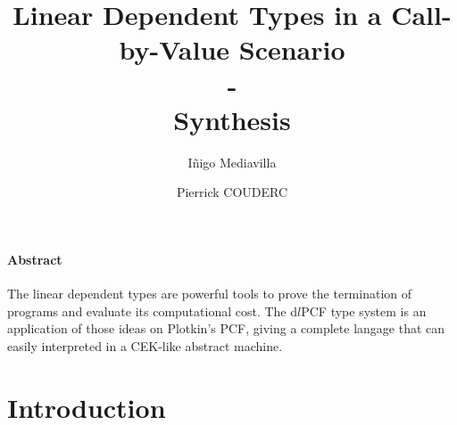 \documentclass[a4paper,12pt]{article}
\title{Linear Dependent Types in a Call-by-Value Scenario \\
- \\
Synthesis}
\author{I\~{n}igo Mediavilla \and Pierrick COUDERC}
\begin{document}
\maketitle









\paragraph{Abstract} 
The linear dependent types are powerful tools to prove the termination of
programs and evaluate its computational cost. The d$l$PCF type system is an
application of those ideas on Plotkin's PCF, giving a complete langage that can
easily interpreted in a CEK-like abstract machine.

\section{Introduction}
\end{document}
